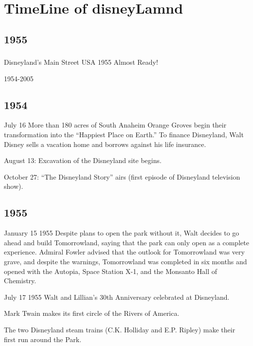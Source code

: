 
\chapter{TimeLine of disneyLamnd} %

\label{ch:tickets} %


\section{1955}
\subsection{}






Disneyland’s Main Street USA 1955 Almost Ready!

1954-2005
\section{1954}
July 16
More than 180 acres of South Anaheim Orange Groves begin their transformation into the “Happiest Place on Earth.”  To finance Disneyland, Walt Disney sells a vacation home and borrows against his life insurance.

August 13:
Excavation of the Disneyland site begins.

October 27:
“The Disneyland Story” airs (first episode of Disneyland television show).
\section{1955}
January 15 1955
Despite plans to open the park without it, Walt decides to go ahead and build Tomorrowland, saying that the park can only open as a complete experience.  Admiral Fowler advised that the outlook for Tomorrowland was very grave, and despite the warnings, Tomorrowland was completed in six months and opened with the Autopia, Space Station X-1, and the Monsanto Hall of Chemistry.

July 17 1955
Walt and Lillian’s 30th Anniversary celebrated at Disneyland.

Mark Twain makes its first circle of the Rivers of America.

The two Disneyland steam trains (C.K. Holliday and E.P. Ripley) make their first run around the Park.

